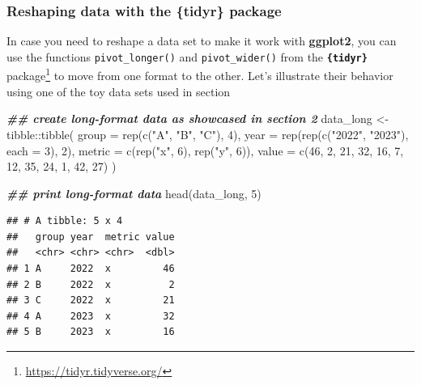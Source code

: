 \documentclass[
]{krantz}
\makeatletter
\newenvironment{Shaded}{\begin{snugshade}}{\end{snugshade}}
\newcommand{\AttributeTok}[1]{\textcolor[rgb]{0.61,0.61,0.61}{#1}}
\newcommand{\DecValTok}[1]{\textcolor[rgb]{0.06,0.06,0.06}{#1}}
\newcommand{\DocumentationTok}[1]{\textcolor[rgb]{0.37,0.37,0.37}{\textbf{\textit{#1}}}}
\newcommand{\FunctionTok}[1]{\textcolor[rgb]{0,0,0}{#1}}
\newcommand{\NormalTok}[1]{#1}
\newcommand{\OtherTok}[1]{\textcolor[rgb]{0.37,0.37,0.37}{#1}}
\newcommand{\SpecialCharTok}[1]{\textcolor[rgb]{0,0,0}{#1}}
\newcommand{\StringTok}[1]{\textcolor[rgb]{0.5,0.5,0.5}{#1}}
\renewcommand{\href}[2]{#2\footnote{\url{#1}}}
\newenvironment{kframe}{%
\medskip{}
\setlength{\fboxsep}{.8em}
 \def\at@end@of@kframe{}%
 \ifinner\ifhmode%
  \def\at@end@of@kframe{\end{minipage}}%
  \begin{minipage}{\columnwidth}%
 \fi\fi%
 \def\FrameCommand##1{\hskip\@totalleftmargin \hskip-\fboxsep
 \colorbox{shadecolor}{##1}\hskip-\fboxsep
     \hskip-\linewidth \hskip-\@totalleftmargin \hskip\columnwidth}%
 \MakeFramed {\advance\hsize-\width
   \@totalleftmargin\z@ \linewidth\hsize
   \@setminipage}}%
 {\par\unskip\endMakeFramed%
 \at@end@of@kframe}
\renewenvironment{Shaded}{\begin{kframe}}{\end{kframe}}
\makeatother
\begin{document}
\hypertarget{tidyr}{%
\subsubsection{Reshaping data with the \{tidyr\} package}\label{tidyr}}

In case you need to reshape a data set to make it work with \textbf{ggplot2}, you can use the functions \texttt{pivot\_longer()} and \texttt{pivot\_wider()} from the \href{https://tidyr.tidyverse.org/}{\textbf{\texttt{\{tidyr\}}} package} \citep{tidyr} to move from one format to the other. Let's illustrate their behavior using one of the toy data sets used in section

\begin{Shaded}
\begin{Highlighting}[]
\DocumentationTok{\#\# create long{-}format data as showcased in section 2}
\NormalTok{data\_long }\OtherTok{\textless{}{-}}\NormalTok{ tibble}\SpecialCharTok{::}\FunctionTok{tibble}\NormalTok{(}
  \AttributeTok{group =} \FunctionTok{rep}\NormalTok{(}\FunctionTok{c}\NormalTok{(}\StringTok{"A"}\NormalTok{, }\StringTok{"B"}\NormalTok{, }\StringTok{"C"}\NormalTok{), }\DecValTok{4}\NormalTok{),}
  \AttributeTok{year =} \FunctionTok{rep}\NormalTok{(}\FunctionTok{rep}\NormalTok{(}\FunctionTok{c}\NormalTok{(}\StringTok{"2022"}\NormalTok{, }\StringTok{"2023"}\NormalTok{), }\AttributeTok{each =} \DecValTok{3}\NormalTok{), }\DecValTok{2}\NormalTok{),}
  \AttributeTok{metric =} \FunctionTok{c}\NormalTok{(}\FunctionTok{rep}\NormalTok{(}\StringTok{"x"}\NormalTok{, }\DecValTok{6}\NormalTok{), }\FunctionTok{rep}\NormalTok{(}\StringTok{"y"}\NormalTok{, }\DecValTok{6}\NormalTok{)),}
  \AttributeTok{value =} \FunctionTok{c}\NormalTok{(}\DecValTok{46}\NormalTok{, }\DecValTok{2}\NormalTok{, }\DecValTok{21}\NormalTok{, }\DecValTok{32}\NormalTok{, }\DecValTok{16}\NormalTok{, }\DecValTok{7}\NormalTok{, }\DecValTok{12}\NormalTok{, }\DecValTok{35}\NormalTok{, }\DecValTok{24}\NormalTok{, }\DecValTok{1}\NormalTok{, }\DecValTok{42}\NormalTok{, }\DecValTok{27}\NormalTok{)}
\NormalTok{)}

\DocumentationTok{\#\# print long{-}format data}
\FunctionTok{head}\NormalTok{(data\_long, }\DecValTok{5}\NormalTok{)}
\end{Highlighting}
\end{Shaded}

\begin{verbatim}
## # A tibble: 5 x 4
##   group year  metric value
##   <chr> <chr> <chr>  <dbl>
## 1 A     2022  x         46
## 2 B     2022  x          2
## 3 C     2022  x         21
## 4 A     2023  x         32
## 5 B     2023  x         16
\end{verbatim}
\end{document}

